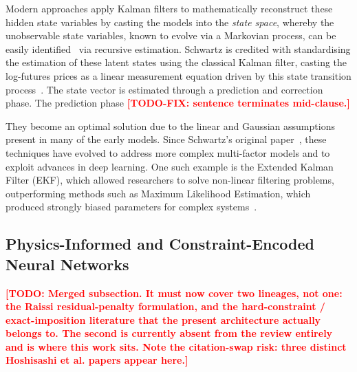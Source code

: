 \documentclass[11pt, a4paper]{article}
\newcommand{\todo}[1]{\textcolor{red}{\textbf{[TODO: #1]}}}
\begin{document}
Modern approaches apply Kalman filters to mathematically reconstruct these hidden state variables by casting the models into the \textit{state space}, whereby the unobservable state variables, known to evolve via a Markovian process, can be easily identified~\cite{Schwartz1997TheHedging} via recursive estimation. Schwartz is credited with standardising the estimation of these latent states using the classical Kalman filter, casting the log-futures prices as a linear measurement equation driven by this state transition process~\cite{Schwartz1997TheHedging}. The state vector is estimated through a prediction and correction phase. The prediction phase \textcolor{red}{\textbf{[TODO-FIX: sentence terminates mid-clause.]}}

They become an optimal solution due to the linear and Gaussian assumptions present in many of the early models. Since Schwartz's original paper~\cite{Schwartz1997TheHedging}, these techniques have evolved to address more complex multi-factor models and to exploit advances in deep learning. One such example is the Extended Kalman Filter (EKF), which allowed researchers to solve non-linear filtering problems, outperforming methods such as Maximum Likelihood Estimation, which produced strongly biased parameters for complex systems~\cite{Liu2009No-ArbitrageStructures}.



\subsection{Physics-Informed and Constraint-Encoded Neural Networks}
\label{sec:lit_pinns}
\label{sec:lit_wamol}
\todo{Merged subsection. It must now cover two lineages, not one: the Raissi
  residual-penalty formulation, and the hard-constraint / exact-imposition
  literature that the present architecture actually belongs to. The second is
  currently absent from the review entirely and is where this work sits. Note
  the citation-swap risk: three distinct Hoshisashi et al. papers appear here.}
\end{document}
